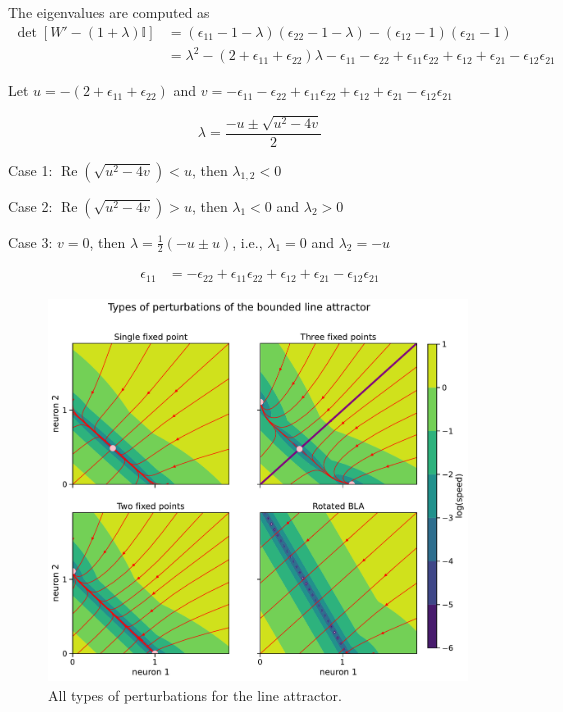 \documentclass{article}
\theoremstyle{definition}
\theoremstyle{remark}
\begin{document}
The eigenvalues are computed as
\begin{align*}
\det [W' -(1+\lambda)\mathbb{I}] &= (\epsilon_{11}-1-\lambda)(\epsilon_{22}-1-\lambda)-(\epsilon_{12}-1)(\epsilon_{21}-1)\\
&=\lambda^2 - (2+\epsilon_{11}+\epsilon_{22})\lambda -\epsilon_{11}-\epsilon_{22}+\epsilon_{11}\epsilon_{22} +\epsilon_{12} + \epsilon_{21} - \epsilon_{12}\epsilon_{21}
\end{align*}

Let 
$u=- (2+\epsilon_{11}+\epsilon_{22})$
and 
$v=-\epsilon_{11}-\epsilon_{22}+\epsilon_{11}\epsilon_{22} + \epsilon_{12} + \epsilon_{21} - \epsilon_{12}\epsilon_{21}$

\begin{equation}
\lambda = \frac{-u \pm \sqrt{u^2-4v}}{2}
\end{equation}



Case 1: $\operatorname{Re}(\sqrt{u^2-4v})<u$, then 
$\lambda_{1,2}<0$


Case 2:  $\operatorname{Re}(\sqrt{u^2-4v})>u$, then 
$\lambda_{1}<0$ and $\lambda_{2}>0$


Case 3: $v=0$, then 
$\lambda=\tfrac{1}{2}(-u\pm u)$, i.e.,
$\lambda_1=0$ and  $\lambda_2=-u$

\begin{align}
\epsilon_{11} &= -\epsilon_{22}+\epsilon_{11}\epsilon_{22} + \epsilon_{12} + \epsilon_{21} - \epsilon_{12}\epsilon_{21}
\end{align}




\begin{figure}[H]
    \centering
    \includegraphics[width=0.99\textwidth]{figures/bounded_lineattractor_allpert.pdf}
    \caption{All types of perturbations for the line attractor.}
    \label{fig:bounded_lineattractor_allpert}
\end{figure}
\end{document}
